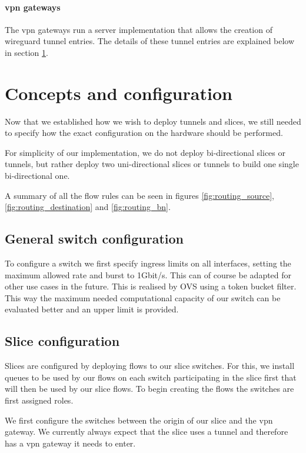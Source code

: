 \paragraph{\acrshort{vpn} gateways} The \acrshort{vpn} gateways run a server implementation that allows the creation of \gls{wireguard} \cite{wireguard} tunnel entries. The details of these tunnel entries are explained below in section \ref{impl_concepts}.


\section{Concepts and configuration}
\label{impl_concepts}
Now that we established how we wish to deploy tunnels and slices, we still needed to specify how the exact configuration on the hardware should be performed.

For simplicity of our implementation, we do not deploy bi-directional slices or tunnels, but rather deploy two uni-directional slices or tunnels to build one single bi-directional one.

A summary of all the flow rules can be seen in figures \ref{fig:routing_source}, \ref{fig:routing_destination} and \ref{fig:routing_bn}.

\subsection{General switch configuration}
To configure a switch we first specify ingress limits on all interfaces, setting the maximum allowed rate and burst to 1Gbit/s. This can of course be adapted for other use cases in the future. This is realised by OVS using a token bucket filter. This way the maximum needed computational capacity of our switch can be evaluated better and an upper limit is provided.

\subsection{Slice configuration}
Slices are configured by deploying flows to our slice switches. For this, we install queues to be used by our flows on each switch participating in the slice first that will then be used by our slice flows. To begin creating the flows the switches are first assigned roles.

We first configure the switches between the origin of our slice and the \acrshort{vpn} gateway. We currently always expect that the slice uses a tunnel and therefore has a \acrshort{vpn} gateway it needs to enter.

